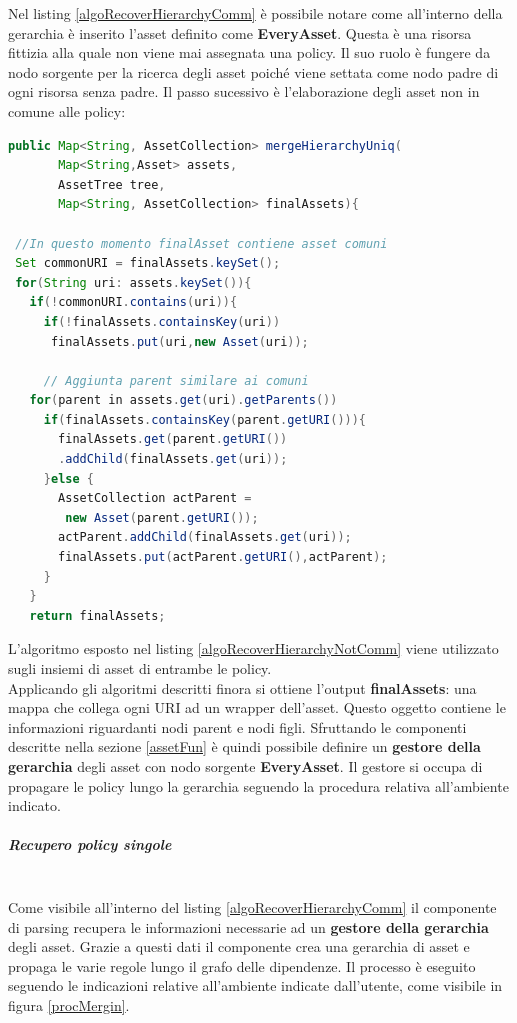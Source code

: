 \documentclass[12pt,a4paper,twoside]{book}
\begin{document}
Nel listing \ref{algoRecoverHierarchyComm} è possibile notare come all'interno della gerarchia è inserito l'asset definito come \textbf{EveryAsset}. Questa è una risorsa fittizia alla quale non viene mai assegnata una policy. Il suo ruolo è fungere da nodo sorgente per la ricerca degli asset poiché viene settata come nodo padre di ogni risorsa senza padre.\newpage
Il passo sucessivo è l'elaborazione degli asset non in comune alle policy:\\
\begin{lstlisting}[language=java,firstnumber=1,caption={L'algoritmo ha prestazioni lineari in proporzione al numero di asset},label=algoRecoverHierarchyNotComm,captionpos=b]
public Map<String, AssetCollection> mergeHierarchyUniq(
       Map<String,Asset> assets,
       AssetTree tree,
       Map<String, AssetCollection> finalAssets){
       
 //In questo momento finalAsset contiene asset comuni      
 Set commonURI = finalAssets.keySet();  
 for(String uri: assets.keySet()){
   if(!commonURI.contains(uri)){
     if(!finalAssets.containsKey(uri))
      finalAssets.put(uri,new Asset(uri));
      
	 // Aggiunta parent similare ai comuni
   for(parent in assets.get(uri).getParents())
     if(finalAssets.containsKey(parent.getURI())){
       finalAssets.get(parent.getURI())
       .addChild(finalAssets.get(uri));
     }else {
       AssetCollection actParent =
        new Asset(parent.getURI());
       actParent.addChild(finalAssets.get(uri));
       finalAssets.put(actParent.getURI(),actParent);
     }
   }
   return finalAssets;
\end{lstlisting}
L'algoritmo esposto nel listing \ref{algoRecoverHierarchyNotComm} viene utilizzato sugli insiemi di asset di entrambe le policy.\\
Applicando gli algoritmi descritti finora si ottiene l'output \textbf{finalAssets}: una mappa che collega ogni URI ad un wrapper dell'asset. Questo oggetto contiene le informazioni riguardanti nodi parent e nodi figli. Sfruttando le componenti descritte nella sezione \ref{assetFun} è quindi possibile definire un \textbf{gestore della gerarchia} degli asset con nodo sorgente \textbf{EveryAsset}. Il gestore si occupa di propagare le policy lungo la gerarchia seguendo la procedura relativa all'ambiente indicato.
\subparagraph{Recupero policy singole}\mbox{}\\
Come visibile all'interno del listing \ref{algoRecoverHierarchyComm} il componente di parsing recupera le informazioni necessarie ad un \textbf{gestore della gerarchia} degli asset. Grazie a questi dati il componente crea una gerarchia di asset e propaga le varie regole lungo il grafo delle dipendenze. Il processo è eseguito seguendo le indicazioni relative all'ambiente indicate dall'utente, come visibile in figura \ref{procMergin}.\\
\end{document}
